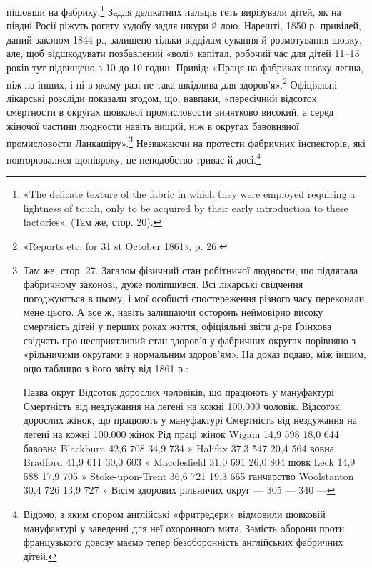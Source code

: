 \parcont{}  %
пішовши на фабрику.\footnote{
«The delicate texture of the fabric in which they were employed
requiring a lightness of touch, only to be acquired by their early introduction
to these factories». (Там же, стор. 20).
} Задля делікатних пальців геть вирізували
дітей, як на півдні Росії ріжуть рогату худобу задля шкури
й лою. Нарешті, 1850 р. привілей, даний законом 1844 р., залишено
тільки відділам сукання й розмотування шовку, але, щоб
відшкодувати позбавлений «волі» капітал, робочий час для дітей
11--13 років тут підвищено з 10 до 10 годин. Привід: «Праця
на фабриках шовку легша, ніж на інших, і ні в якому разі не така
шкідлива для здоров’я».\footnote{
«Reports etc. for 31 st October 1861», p. 26.
} Офіціяльні лікарські розсліди показали
згодом, що, навпаки, «пересічний відсоток смертности в
округах шовкової промисловости винятково високий, а серед жіночої
частини людности навіть вищий, ніж в округах бавовняної
промисловости Ланкашіру».\footnote{
Там же, стор. 27. Загалом фізичний стан робітничої людности,
що підлягала фабричному законові, дуже поліпшився. Всі лікарські
свідчення погоджуються в цьому, і мої особисті спостереження різного
часу переконали мене цього. А все ж, навіть залишаючи осторонь неймовірно
високу смертність дітей у перших роках життя, офіціяльні
звіти д-ра Ґрінхова свідчать про несприятливий стан здоров’я у фабричних
округах порівняно з «рільничими округами з нормальним здоров'ям».
На доказ подаю, між іншим, оцю таблицю з його звіту від 1861 р.:

Назва округ    Відсоток дорослих чоловіків, що працюють у мануфактурі    Смертність від нездужання
на легені на кожні 100.000 чоловік. Відсоток дорослих жінок, що працюють у мануфактурі    Смертність
від нездужання на легені на кожні 100.000 жінок    Рід праці жінок
Wigam                        14,9     598    18,0     644    бавовна
Blackburn                   42,6     708    34,9     734          »
Halifax                        37,3      547    20,4     564     вовна
Bradford                      41,9     611   30,0    603         »
Macclesfield               31,0     691    26,0     804      шовк
Leck                             14,9     588    17,9     705           »
Stoke-upon-Trent     36,6    721    19,3     665    ганчарство
Woolstanton              30,4    726    13,9      727           »
Вісім здорових
рільничих округ       —       305   —        340            —
} Незважаючи на протести фабричних
інспекторів, які повторювалися щопівроку, це неподобство
триває й досі.\footnote{
Відомо, з яким опором англійські «фритредери» відмовили шовковій
мануфактурі у заведенні для неї охоронного мита. Замість оборони
проти французького довозу маємо тепер безоборонність англійських фабричних
дітей.
}
